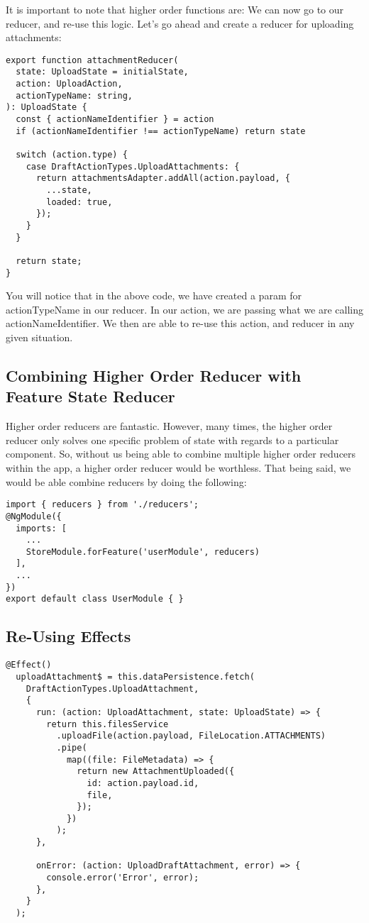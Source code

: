 It is important to note that higher order functions are:
We can now go to our reducer, and re-use this logic. Let's
go ahead and create a reducer for uploading attachments:

\begin{lstlisting}
export function attachmentReducer(
  state: UploadState = initialState,
  action: UploadAction,
  actionTypeName: string,
): UploadState {
  const { actionNameIdentifier } = action
  if (actionNameIdentifier !== actionTypeName) return state

  switch (action.type) {
    case DraftActionTypes.UploadAttachments: {
      return attachmentsAdapter.addAll(action.payload, {
        ...state,
        loaded: true,
      });
    }
  }

  return state;
}
\end{lstlisting}

You will notice that in the above code, we have created a param for
actionTypeName in our reducer. In our action, we are passing what we are calling
actionNameIdentifier. We then are able to re-use this action, and reducer in any
given situation.

\subsection{Combining Higher Order Reducer with Feature State Reducer }

Higher order reducers are fantastic. However, many times, the higher order
reducer only solves one specific problem of state with regards to a particular
component. So, without us being able to combine multiple higher order reducers
within the app, a higher order reducer would be worthless. That being said, we
would be able combine reducers by doing the following:

\begin{lstlisting}
import { reducers } from './reducers';
@NgModule({
  imports: [
    ...
    StoreModule.forFeature('userModule', reducers)
  ],
  ...
})
export default class UserModule { }
\end{lstlisting}

\subsection{Re-Using Effects}
\begin{lstlisting}
@Effect()
  uploadAttachment$ = this.dataPersistence.fetch(
    DraftActionTypes.UploadAttachment,
    {
      run: (action: UploadAttachment, state: UploadState) => {
        return this.filesService
          .uploadFile(action.payload, FileLocation.ATTACHMENTS)
          .pipe(
            map((file: FileMetadata) => {
              return new AttachmentUploaded({
                id: action.payload.id,
                file,
              });
            })
          );
      },

      onError: (action: UploadDraftAttachment, error) => {
        console.error('Error', error);
      },
    }
  );
\end{lstlisting}

